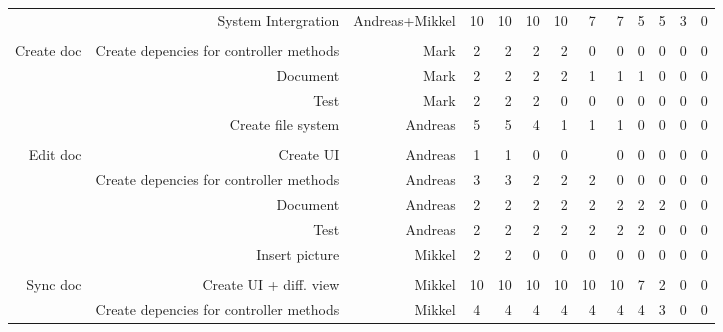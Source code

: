 \documentclass[a4paper,11pt,report]{report}
\begin{document}
\begin{landscape}
\begin{table}[htbp]
\begin{tabular}{rrrrrrrrrrrrr}
          & System Intergration & Andreas+Mikkel & \multicolumn{1}{c}{10} & 10    & 10    & 10    & 7     & 7     & 5     & 5     & 3     & 0 \\
          &       &       & \multicolumn{1}{c}{} &       &       &       &       &       &       &       &       &  \\
    Create doc & Create depencies for controller methods & Mark  & \multicolumn{1}{c}{2} & 2     & 2     & 2     & 0     & 0     & 0     & 0     & 0     & 0 \\
          & Document & Mark  & \multicolumn{1}{c}{2} & 2     & 2     & 2     & 1     & 1     & 1     & 0     & 0     & 0 \\
          & Test  & Mark  & \multicolumn{1}{c}{2} & 2     & 2     & 0     & 0     & 0     & 0     & 0     & 0     & 0 \\
          & Create file system & Andreas & \multicolumn{1}{c}{5} & 5     & 4     & 1     & 1     & 1     & 0     & 0     & 0     & 0 \\
          &       &       & \multicolumn{1}{c}{} &       &       &       &       &       &       &       &       &  \\
    Edit doc & Create UI & Andreas & \multicolumn{1}{c}{1} & 1     & 0     & 0     &       & 0     & 0     & 0     & 0     & 0 \\
          & Create depencies for controller methods & Andreas & \multicolumn{1}{c}{3} & 3     & 2     & 2     & 2     & 0     & 0     & 0     & 0     & 0 \\
          & Document & Andreas & \multicolumn{1}{c}{2} & 2     & 2     & 2     & 2     & 2     & 2     & 2     & 0     & 0 \\
          & Test  & Andreas & \multicolumn{1}{c}{2} & 2     & 2     & 2     & 2     & 2     & 2     & 0     & 0     & 0 \\
          & Insert picture & Mikkel & \multicolumn{1}{c}{2} & 2     & 0     & 0     & 0     & 0     & 0     & 0     & 0     & 0 \\
          &       &       & \multicolumn{1}{c}{} &       &       &       &       &       &       &       &       &  \\
    Sync doc & Create UI + diff. view & Mikkel & \multicolumn{1}{c}{10} & 10    & 10    & 10    & 10    & 10    & 7     & 2     & 0     & 0 \\
          & Create depencies for controller methods & Mikkel & \multicolumn{1}{c}{4} & 4     & 4     & 4     & 4     & 4     & 4     & 3     & 0     & 0 \\

\end{tabular}
\end{table}
\end{landscape}
\end{document}
